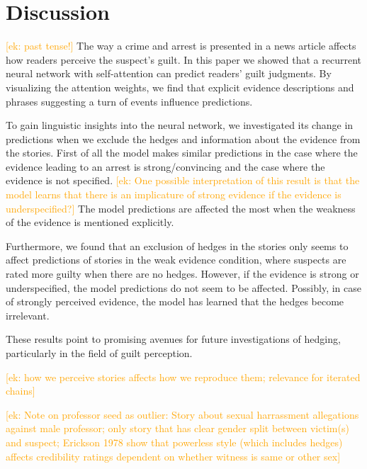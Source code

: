 \documentclass[11pt,a4paper]{article}
\newcommand{\ek}[1]{\textcolor{Orange}{[ek: #1]}}
\begin{document}
%
%

\section{Discussion}
\ek{past tense!}
The way a crime and arrest is presented in a news article affects how readers perceive the suspect's guilt. In this paper we showed that a recurrent neural network with self-attention can predict readers' guilt judgments. 
By visualizing the attention weights, we find that explicit evidence descriptions and phrases suggesting a turn of events influence predictions. 

To gain linguistic insights into the neural network, we investigated its change in predictions when we exclude the hedges and information about the evidence from the stories. First of all the model makes similar predictions in the case where the evidence leading to an arrest is strong/convincing and the case where the evidence is not specified. 
\ek{One possible interpretation of this result is that the model learns that there is an implicature of strong evidence if the evidence is underspecified?} The model predictions are affected the most when the weakness of the evidence is mentioned explicitly.

Furthermore, we found that an exclusion of hedges in the stories only seems to affect predictions of stories in the weak evidence condition, where suspects are rated more guilty when there are no hedges. However, if the evidence is strong or underspecified, the model predictions do not seem to be affected. 
Possibly, in case of strongly perceived evidence, the model has learned that the hedges become irrelevant.

These results point to promising avenues for future investigations of hedging, particularly in the field of guilt perception. 

\ek{how we perceive stories affects how we reproduce them; relevance for iterated chains}

\ek{Note on professor seed as outlier: Story about sexual harrassment allegations against male professor; only story that has clear gender split between victim(s) and suspect; Erickson 1978 show that powerless style (which includes hedges) affects credibility ratings dependent on whether witness is same or other sex}
\end{document}
